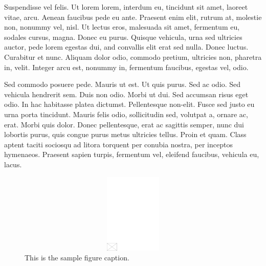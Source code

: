 \documentclass[AMS,STIX2COL]{WileyNJD-v2}
\begin{document}
    Suspendisse vel felis. Ut lorem lorem, interdum eu, tincidunt sit amet, laoreet vitae, arcu. Aenean faucibus pede eu ante. Praesent enim elit, rutrum at, molestie non, nonummy vel, nisl. Ut lectus eros, malesuada sit amet, fermentum
    eu, sodales cursus, magna. Donec eu purus. Quisque vehicula, urna sed ultricies auctor, pede lorem egestas dui, and convallis elit erat sed nulla. Donec luctus. Curabitur et nunc. Aliquam dolor odio, commodo pretium, ultricies non,
    pharetra in, velit. Integer arcu est, nonummy in, fermentum faucibus, egestas vel, odio.

    Sed commodo posuere pede. Mauris ut est. Ut quis purus. Sed ac odio. Sed vehicula hendrerit sem. Duis non
    odio. Morbi ut dui. Sed accumsan risus eget odio. In hac habitasse platea dictumst. Pellentesque non-elit. Fusce
    sed justo eu urna porta tincidunt. Mauris felis odio, sollicitudin sed, volutpat a, ornare ac, erat. Morbi quis dolor.
    Donec pellentesque, erat ac sagittis semper, nunc dui lobortis purus, quis congue purus metus ultricies tellus. Proin et quam. Class aptent taciti sociosqu ad litora torquent per conubia nostra, per inceptos hymenaeos. Praesent sapien turpis, fermentum vel, eleifend faucibus, vehicula eu, lacus.

    \begin{figure}
        \centerline{\includegraphics[width=342pt,height=9pc,draft]{empty}}
        \caption{This is the sample figure caption.\label{fig2}}
    \end{figure}
\end{document}
